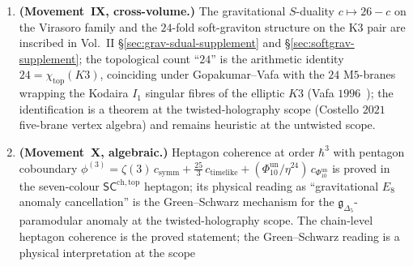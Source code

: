 \begin{remark}
\begin{enumerate}[label=\textup{(\Roman*)}]
 $\Phi_{10}^{\mathrm{un}}(Z)$''
 denotes this identity under the Costello--Gaiotto--Paquette
 twisted-holography dictionary and \emph{not} the Maloney--Witten
 $2009$ sum over smooth Euclidean saddles (BTZ and $\mathrm{SL}(2,
 \mathbb{Z})$-images of thermal $\mathrm{AdS}_3$), which evaluates
 a different formal path integral. The Dijkgraaf--Moore--Verlinde--Verlinde
 $1997$~\cite{DijkgraafMooreVerlindeVerlinde1997} generating
 function counts BPS black-hole microstates of type~IIA on
 $K3 \times T^2$ (equivalently, symmetric-product orbifold
 elliptic genera): this is \emph{also} $1/\Phi_{10}^{\mathrm{un}}(Z)$ by the
 Maldacena--Moore--Strominger $1999$ identification, but it equals
 the twisted-holography boundary character, not the dynamical-metric
 bulk partition function. The three identifications
 (twisted-holography bulk, DVV BPS counting, Maloney--Witten smooth
 saddle sum) coincide at the level of the automorphic form
 $\Phi_{10}^{\mathrm{un}}$ and diverge at the level of what integrates
 to produce it. The twisted-holography identification is proved at the
 factorisation-algebra scope; the Maloney--Witten identification
 requires the full off-shell path integral and remains conjectural.
\item \textbf{(Movement~IX, cross-volume.)} The gravitational
 $S$-duality $c \mapsto 26 - c$ on the Virasoro family and the
 $24$-fold soft-graviton structure on the K3 pair are
 inscribed in Vol.~II
 \S\ref{sec:grav-sdual-supplement} and \S\ref{sec:softgrav-supplement};
 the topological count ``$24$'' is the arithmetic identity
 $24 = \chi_{\mathrm{top}}(K3)$, coinciding under
 Gopakumar--Vafa with the $24$ M$5$-branes wrapping the Kodaira
 $I_1$ singular fibres of the elliptic $K3$
 (Vafa $1996$~\cite{Vafa1996F}); the identification is a theorem
 at the twisted-holography scope (Costello $2021$ five-brane vertex
 algebra) and remains heuristic at the untwisted scope.
\item \textbf{(Movement~X, algebraic.)} Heptagon coherence at order
 $\hbar^3$ with pentagon coboundary
 $\phi^{(3)} = \zeta(3)\, c_{\mathrm{symm}}
 + \tfrac{25}{3}\, c_{\mathrm{timelike}}
 + (\Phi_{10}^{\mathrm{un}}/\eta^{24})\, c_{\Phi_{10}^{\mathrm{un}}}$
 is proved in the seven-colour $\mathsf{SC}^{\mathrm{ch,top}}$
 heptagon; its physical reading as ``gravitational $E_8$ anomaly
 cancellation'' is the Green--Schwarz mechanism for the
 $\mathfrak{g}_{\Delta_5}$-paramodular anomaly at the twisted-holography
 scope. The chain-level heptagon coherence is the proved statement;
 the Green--Schwarz reading is a physical interpretation at the scope

\end{enumerate}
\end{remark}
